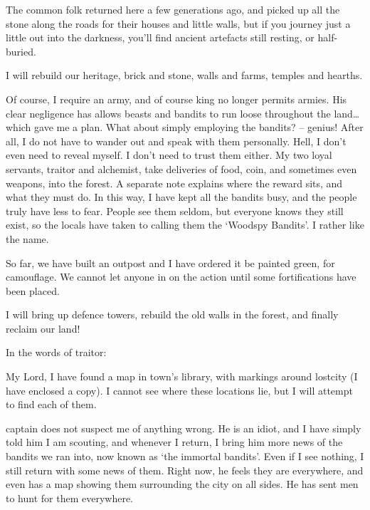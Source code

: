 \begin{multicols}{2}
\begin{exampletext}
  The common folk returned here a few generations ago, and picked up all the stone along the roads for their houses and little walls, but if you journey just a little out into the darkness, you'll find ancient artefacts still resting, or half-buried.

  I will rebuild our heritage, brick and stone, walls and farms, temples and hearths.

  Of course, I require an army, and of course \gls{king} no longer permits armies.
  His clear negligence has allows beasts and bandits to run loose throughout the land\ldots which gave me a plan.
  What about simply employing the bandits? -- genius!
  After all, I do not have to wander out and speak with them personally.
  Hell, I don't even need to reveal myself.
  I don't need to trust them either.
  My two loyal servants, \gls{traitor} and \gls{alchemist}, take deliveries of food, coin, and sometimes even weapons, into the forest.
  A separate note explains where the reward sits, and what they must do.
  In this way, I have kept all the bandits busy, and the people truly have less to fear.
  People see them seldom, but everyone knows they still exist, so the locals have taken to calling them the `Woodspy Bandits'.
  I rather like the name.

  So far, we have built an outpost and I have ordered it be painted green, for camouflage.
  We cannot let anyone in on the action until some fortifications have been placed.
  
  I will bring up defence towers, rebuild the old walls in the forest, and finally reclaim our land!

\end{exampletext}

In the words of \gls{traitor}:

\begin{exampletext}

  My Lord,
  I have found a map in \gls{town}'s library, with markings around \gls{lostcity} (I have enclosed a copy).
  I cannot see where these locations lie, but I will attempt to find each of them.

  \Gls{captain} does not suspect me of anything wrong.
  He is an idiot, and I have simply told him I am scouting, and whenever I return, I bring him more news of the bandits we ran into, now known as `the immortal bandits'.
  Even if I see nothing, I still return with some news of them.
  Right now, he feels they are everywhere, and even has a map showing them surrounding the city on all sides.
  He has sent men to hunt for them everywhere.


\end{exampletext}
\end{multicols}

